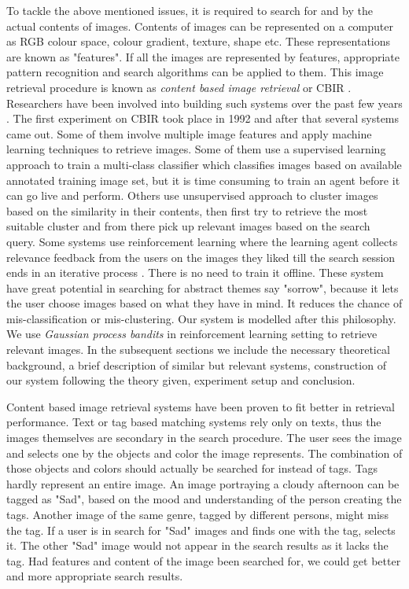 \documentclass[english]{tktltiki}
\begin{document}
To tackle the above mentioned issues, it is required to search for and by the actual contents of images. Contents of images can be represented on a computer as RGB colour space, colour gradient, texture, shape etc. These representations are known as "features". If all the images are represented by features, appropriate pattern recognition and search algorithms can be applied to them. This image retrieval procedure is known as \textit{content based image retrieval} or CBIR \cite{cbir_1, cbir_2}. Researchers have been involved into building such systems over the past few years \cite{cbir_3, cbir_4}. The first experiment on CBIR took place in 1992 \cite{cbir_1st} and after that several systems came out. Some of them involve multiple image features and apply machine learning techniques to retrieve images. Some of them use a supervised learning approach to train a multi-class classifier which classifies images based on available annotated training image set, but it is time consuming to train an agent before it can go live and perform. Others use unsupervised approach to cluster images based on the similarity in their contents, then first try to retrieve the most suitable cluster and from there pick up relevant images based on the search query. Some systems use reinforcement learning where the learning agent collects relevance feedback \cite{rel_feed} from the users on the images they liked till the search session ends in an iterative process \cite{pichunter, PicSOM, inter_rel_feed}. There is no need to train it offline. These system have great potential in searching for abstract themes say "sorrow", because it lets the user choose images based on what they have in mind. It reduces the chance of mis-classification or mis-clustering. Our system is modelled after this philosophy. We use \textit{Gaussian process bandits} in reinforcement learning setting to retrieve relevant images. In the subsequent sections we include the necessary theoretical background, a brief description of similar but relevant systems, construction of our system following the theory given, experiment setup and conclusion. 

\iffalse
Content based image retrieval systems have been proven to fit better in retrieval performance. Text or tag based matching systems rely only on texts, thus the images themselves are secondary in the search procedure. The user sees the image and selects one by the objects and color the image represents. The combination of those objects and colors should actually be searched for instead of tags. Tags hardly represent an entire image. An image portraying a cloudy afternoon can be tagged as "Sad", based on the mood and understanding of the person creating the tags. Another image of the same genre, tagged by different persons, might miss the tag. If a user is in search for "Sad" images and finds one with the tag, selects it. The other "Sad" image would not appear in the search results as it lacks the tag. Had features and content of the image been searched for, we could get better and more appropriate search results.
\end{document}
